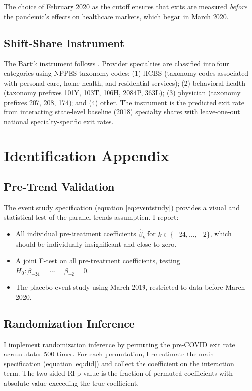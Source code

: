 \documentclass[12pt]{article}
\begin{document}
The choice of February 2020 as the cutoff ensures that exits are measured \emph{before} the pandemic's effects on healthcare markets, which began in March 2020.

\subsection{Shift-Share Instrument}

The Bartik instrument follows \citet{goldsmithpinkham2020}. Provider specialties are classified into four categories using NPPES taxonomy codes: (1) HCBS (taxonomy codes associated with personal care, home health, and residential services); (2) behavioral health (taxonomy prefixes 101Y, 103T, 106H, 2084P, 363L); (3) physician (taxonomy prefixes 207, 208, 174); and (4) other. The instrument is the predicted exit rate from interacting state-level baseline (2018) specialty shares with leave-one-out national specialty-specific exit rates.

\section{Identification Appendix}

\subsection{Pre-Trend Validation}

The event study specification (equation \ref{eq:eventstudy}) provides a visual and statistical test of the parallel trends assumption. I report:
\begin{itemize}
\item All individual pre-treatment coefficients $\hat{\beta}_k$ for $k \in \{-24, \ldots, -2\}$, which should be individually insignificant and close to zero.
\item A joint F-test on all pre-treatment coefficients, testing $H_0: \beta_{-24} = \cdots = \beta_{-2} = 0$.
\item The placebo event study using March 2019, restricted to data before March 2020.
\end{itemize}

\subsection{Randomization Inference}

I implement randomization inference by permuting the pre-COVID exit rate across states 500 times. For each permutation, I re-estimate the main specification (equation \ref{eq:did}) and collect the coefficient on the interaction term. The two-sided RI p-value is the fraction of permuted coefficients with absolute value exceeding the true coefficient.
\end{document}
